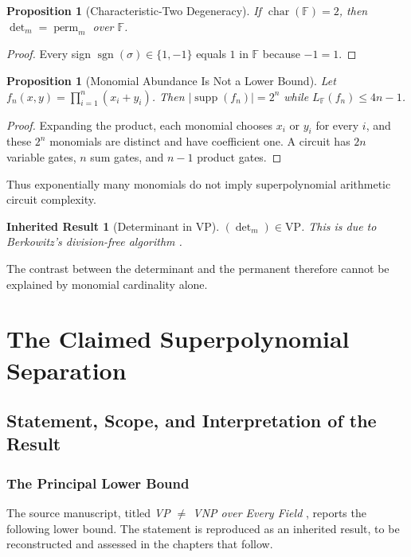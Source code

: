 \documentclass[11pt,letterpaper]{report}
\theoremstyle{plain}
\newtheorem{proposition}[theorem]{Proposition}
\newtheorem{inherited}[theorem]{Inherited Result}
\theoremstyle{definition}
\theoremstyle{remark}
\DeclareMathOperator{\sgn}{sgn}
\DeclareMathOperator{\perm}{perm}
\newcommand{\VP}{\mathrm{VP}}
\begin{document}
\begin{proposition}[Characteristic-Two Degeneracy]
If $\operatorname{char}(\mathbb F)=2$, then $\det_m=\perm_m$ over $\mathbb F$.
\end{proposition}
\begin{proof}
Every sign $\sgn(\sigma)\in\{1,-1\}$ equals $1$ in $\mathbb F$ because $-1=1$.
\end{proof}

\begin{proposition}[Monomial Abundance Is Not a Lower Bound]
Let $f_n(x,y)=\prod_{i=1}^{n}(x_i+y_i)$. Then $|\operatorname{supp}(f_n)|=2^n$ while $L_{\mathbb F}(f_n)\le4n-1$.
\end{proposition}
\begin{proof}
Expanding the product, each monomial chooses $x_i$ or $y_i$ for every $i$, and these $2^n$ monomials are distinct and have coefficient one. A circuit has $2n$ variable gates, $n$ sum gates, and $n-1$ product gates.
\end{proof}

Thus exponentially many monomials do not imply superpolynomial arithmetic circuit complexity.

\begin{inherited}[Determinant in VP]
$(\det_m)\in\VP$. This is due to Berkowitz's division-free algorithm \cite{Berkowitz1984}.
\end{inherited}

The contrast between the determinant and the permanent therefore cannot be explained by monomial cardinality alone.

\part{The Claimed Superpolynomial Separation}

\chapter{Statement, Scope, and Interpretation of the Result}

\section{The Principal Lower Bound}

The source manuscript, titled \emph{VP $\neq$ VNP over Every Field} \cite{Source2026}, reports the following lower bound. The statement is reproduced as an inherited result, to be reconstructed and assessed in the chapters that follow.
\end{document}
